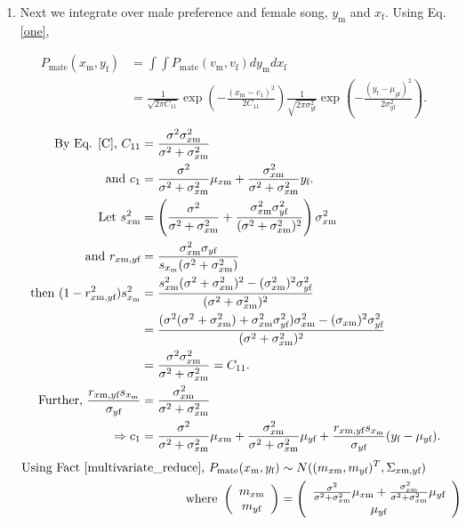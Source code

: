 \documentclass{article}
\newcommand{\x}[1]{\text{#1}}
\begin{document}
\begin{pf}
\begin{enumerate}
\item Next we integrate over male preference and female song, $y_\x{m}$ and $x_\x{f}$. Using Eq. \ref{one},

\begin{align*}
P_\text{mate}(x_\x{m},y_\x{f})&=\int \int P_\text{mate}(v_\x{m},v_\x{f})dy_\x{m}dx_\x{f}
\\&=\frac{1}{\sqrt{2\pi C_{11}}}\exp\left(-\frac{(x_\x{m}-c_1)^2}{2C_{11}}\right)\frac{1}{\sqrt{2\pi \sigma_{y\x{f}}^2}}\exp\left(-\frac{(y_\x{f}-\mu_{y\x{f}})^2}{2\sigma_{y\x{f}}^2}\right).
\end{align*}
\begin{align*}
\text{By Eq. \ref{C}, } C_{11}&=\frac{\sigma^2\sigma_{x\x{m}}^2}{\sigma^2+\sigma_{x\x{m}}^2}
\\ \text{ and } c_1&=\frac{\sigma^2}{\sigma^2+\sigma_{x\x{m}}^2}\mu_{x\x{m}}+\frac{\sigma_{x\x{m}}^2}{\sigma^2+\sigma_{x\x{m}}^2}y_\x{f}.
\\ \text{ Let } s_{x\x{m}}^2&=\left(\frac{\sigma^2}{\sigma^2+\sigma_{x\x{m}}^2}+\frac{\sigma_{x\x{m}}^2\sigma_{y\x{f}}^2}{(\sigma^2+\sigma_{x\x{m}}^2)^2}\right)\sigma_{x\x{m}}^2
\\ \text{ and } r_{x\x{m},y\x{f}}&=\frac{\sigma_{x\x{m}}^2\sigma_{y\x{f}}}{s_{x_\x{m}}(\sigma^2+\sigma_{x\x{m}}^2)}
\\ \text{ then } (1-r_{x\x{m},y\x{f}}^2)s_{x_\x{m}}^2&=\frac{s_{x\x{m}}^2(\sigma^2+\sigma_{x\x{m}}^2)^2-(\sigma_{x\x{m}}^2)^2\sigma_{y\x{f}}^2}{(\sigma^2+\sigma_{x\x{m}}^2)^2}
\\&=\frac{(\sigma^2(\sigma^2+\sigma_{x\x{m}}^2)+\sigma_{x\x{m}}^2\sigma_{y\x{f}}^2)\sigma_{x\x{m}}^2-(\sigma_{x\x{m}})^2\sigma_{y\x{f}}^2}{(\sigma^2+\sigma_{x\x{m}}^2)^2}
\\&=\frac{\sigma^2\sigma_{x\x{m}}^2}{\sigma^2+\sigma_{x\x{m}}^2}=C_{11}.
\\\text{ Further, } \frac{r_{x\x{m},y\x{f}}s_{x_\x{m}}}{\sigma_{y\x{f}}}&=\frac{\sigma_{x\x{m}}^2}{\sigma^2+\sigma_{x\x{m}}^2}
\\ \Rightarrow c_1&=\frac{\sigma^2}{\sigma^2+\sigma_{x\x{m}}^2}\mu_{x\x{m}}+\frac{\sigma_{x\x{m}}^2}{\sigma^2+\sigma_{x\x{m}}^2}\mu_{y\x{f}}+\frac{r_{x\x{m},y\x{f}}s_{x_\x{m}}}{\sigma_{y\x{f}}}(y_\x{f}-\mu_{y\x{f}}).
\end{align*}
\begin{align*}
\text{Using Fact \ref{multivariate_reduce}, }  P_\text{mate}(x_\x{m},y_\x{f})&\sim N((m_{x\x{m}},m_{y\x{f}})^T,\Sigma_{x\x{m},y\x{f}})
\\ \text{ where } \left(\begin{array}{c}m_{x\x{m}} \\ m_{y\x{f}} \end{array}\right)&=\left(\begin{array}{c}\frac{\sigma^2}{\sigma^2+\sigma_{x\x{m}}^2}\mu_{x\x{m}}+\frac{\sigma_{x\x{m}}^2}{\sigma^2+\sigma_{x\x{m}}^2}\mu_{y\x{f}} \\ \mu_{y\x{f}} \end{array}\right)

\end{align*}
\end{enumerate}
\end{pf}
\end{document}
